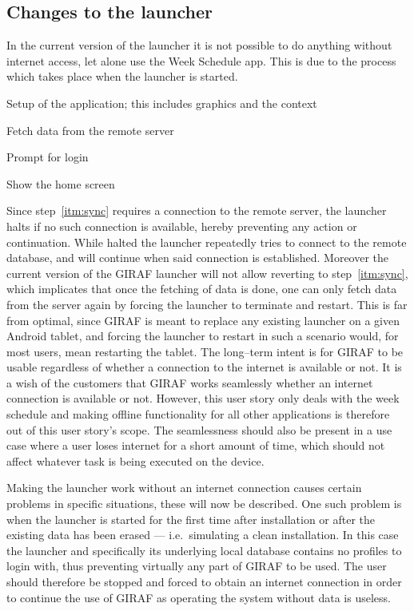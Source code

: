 \subsection{Changes to the launcher}\label{sub:changes_to_the_launcher}
In the current version of the launcher it is not possible to do anything without internet access, let alone use the Week Schedule app.
This is due to the process which takes place when the launcher is started.
\begin{enumberate}
    \item Setup of the application; this includes graphics and the context
    \item\label{itm:sync} Fetch data from the remote server
    \item Prompt for login
    \item Show the home screen
\end{enumberate}
Since step~\ref{itm:sync} requires a connection to the remote server, the launcher halts if no such connection is available, hereby preventing any action or continuation.
While halted the launcher repeatedly tries to connect to the remote database, and will continue when said connection is established.
Moreover the current version of the GIRAF launcher will not allow reverting to step~\ref{itm:sync}, which implicates that once the fetching of data is done, one can only fetch data from the server again by forcing the launcher to terminate and restart.
This is far from optimal, since GIRAF is meant to replace any existing launcher on a given Android tablet, and forcing the launcher to restart in such a scenario would, for most users, mean restarting the tablet.
The long--term intent is for GIRAF to be usable regardless of whether a connection to the internet is available or not.
It is a wish of the customers that GIRAF works seamlessly whether an internet connection is available or not.
However, this user story only deals with the week schedule and making offline functionality for all other applications is therefore out of this user story's scope.
The seamlessness should also be present in a use case where a user loses internet for a short amount of time, which should not affect whatever task is being executed on the device.

\bigskip
Making the launcher work without an internet connection causes certain problems in specific situations, these will now be described.
One such problem is when the launcher is started for the first time after installation or after the existing data has been erased --- i.e.\ simulating a clean installation.
In this case the launcher and specifically its underlying local database contains no profiles to login with, thus preventing virtually any part of GIRAF to be used.
The user should therefore be stopped and forced to obtain an internet connection in order to continue the use of GIRAF as operating the system without data is useless.

